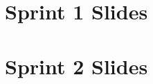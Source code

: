 \documentclass{article}
\begin{document}
\section{Sprint 1 Slides}

\section{Sprint 2 Slides}

\end{document}

